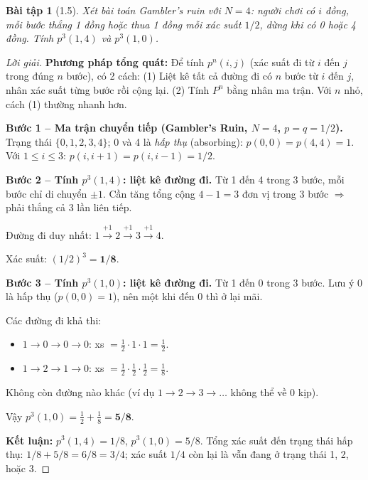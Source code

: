 \documentclass[8pt,a4paper]{article}
\newtheorem{exercise}{Bài tập}
\newenvironment{solution}{\begin{proof}[Lời giải]}{\end{proof}}
\begin{document}
\begin{exercise}[1.5]
Xét bài toán Gambler's ruin với $N = 4$: người chơi có $i$ đồng, mỗi bước thắng 1 đồng hoặc thua 1 đồng mỗi xác suất $1/2$, dừng khi có 0 hoặc 4 đồng. Tính $p^3(1,4)$ và $p^3(1,0)$.
\end{exercise}
\begin{solution}
\textbf{Phương pháp tổng quát:} Để tính $p^n(i,j)$ (xác suất đi từ $i$ đến $j$ trong đúng $n$ bước), có 2 cách: (1) Liệt kê tất cả đường đi có $n$ bước từ $i$ đến $j$, nhân xác suất từng bước rồi cộng lại. (2) Tính $P^n$ bằng nhân ma trận. Với $n$ nhỏ, cách (1) thường nhanh hơn.

\textbf{Bước 1 -- Ma trận chuyển tiếp (Gambler's Ruin, $N=4$, $p=q=1/2$).}
Trạng thái $\{0,1,2,3,4\}$; 0 và 4 là \emph{hấp thụ} (absorbing): $p(0,0)=p(4,4)=1$. Với $1 \leq i \leq 3$: $p(i,i+1)=p(i,i-1)=1/2$.

\textbf{Bước 2 -- Tính $p^3(1,4)$: liệt kê đường đi.}
Từ 1 đến 4 trong 3 bước, mỗi bước chỉ di chuyển $\pm 1$. Cần tăng tổng cộng $4-1=3$ đơn vị trong 3 bước $\Rightarrow$ phải thắng cả 3 lần liên tiếp.

Đường đi duy nhất: $1 \xrightarrow{+1} 2 \xrightarrow{+1} 3 \xrightarrow{+1} 4$.

Xác suất: $(1/2)^3 = \mathbf{1/8}$.

\textbf{Bước 3 -- Tính $p^3(1,0)$: liệt kê đường đi.}
Từ 1 đến 0 trong 3 bước. Lưu ý 0 là hấp thụ ($p(0,0)=1$), nên một khi đến 0 thì ở lại mãi.

Các đường đi khả thi:
\begin{itemize}
  \item $1 \to 0 \to 0 \to 0$: xs $= \frac{1}{2} \cdot 1 \cdot 1 = \frac{1}{2}$.
  \item $1 \to 2 \to 1 \to 0$: xs $= \frac{1}{2} \cdot \frac{1}{2} \cdot \frac{1}{2} = \frac{1}{8}$.
\end{itemize}
Không còn đường nào khác (ví dụ $1\to 2\to 3\to \ldots$ không thể về 0 kịp).

Vậy $p^3(1,0) = \frac{1}{2} + \frac{1}{8} = \mathbf{5/8}$.

\textbf{Kết luận:} $p^3(1,4) = 1/8$, $p^3(1,0) = 5/8$. Tổng xác suất đến trạng thái hấp thụ: $1/8 + 5/8 = 6/8 = 3/4$; xác suất $1/4$ còn lại là vẫn đang ở trạng thái 1, 2, hoặc 3.
\end{solution}
\end{document}
